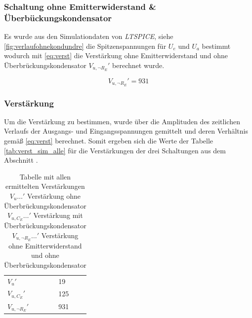 \documentclass[12pt,english,ngerman]{scrartcl}
\begin{document}
\subsubsection{Schaltung ohne Emitterwiderstand \& Überbückungskondensator}

Es wurde aus den Simulationdaten von \textit{LTSPICE}, siehe
\autoref{fig:verlaufohnekondundre} die Spitzenspannungen für $U_e$ und $U_a$
bestimmt wodurch mit \autoref{eq:verst} die Verstärkung ohne Emitterwiderstand
und ohne Überbrückungskondensator $V_{u,\neg R_{E}}'$ berechnet wurde.

\begin{equation}
  V_{u,\neg R_{E}}' = 931
  \label{eq:sim_verst_ohne_ohne_re}
\end{equation}

\subsubsection{Verstärkung} \label{sec:ausverst}
Um die Verstärkung zu bestimmen, wurde über die Amplituden des zeitlichen
Verlaufs der Ausgangs- und Eingangsspannungen gemittelt und deren Verhältnis
gemäß \autoref{eq:verst} berechnet. Somit ergeben sich die Werte der Tabelle
\autoref{tab:verst_sim_alle} für die Verstärkungen der drei Schaltungen aus dem Abschnitt
. 


\begin{table}[H]
  \caption{Tabelle mit allen ermittelten Verstärkungen \\
  $V_{u} \dots'$ Verstärkung ohne Überbrückungskondensator \\
  $V_{u,C_{E}} \dots'$   Verstärkung mit Überbrückungskondensator \\
  $V_{u,\neg R_{E}} \dots'$ Verstärkung ohne Emitterwiderstand und ohne Überbrückungskondensator 
  }
  \label{tab:verst_sim_alle}
  \centering
  \begin{tabular}{l|l}
  $V_{u}'$            & 19 \\
  $V_{u,C_{E}}'$      & 125 \\
  $V_{u,\neg R_{E}}'$ & 931
  \end{tabular}
\end{table}



\end{document}
